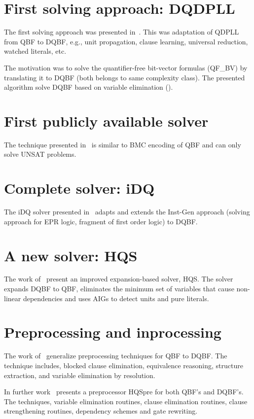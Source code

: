 \documentclass[runningheads]{llncs}
\begin{document}
\section{First solving approach: DQDPLL}
The first solving approach was presented in~\cite{frohlich2012dpll}.
%
This was adaptation of QDPLL from QBF to DQBF, e.g., unit propagation, clause
learning, universal reduction, watched literals, etc.
%

The motivation was to solve the quantifier-free bit-vector formulas (QF\_BV) by translating it to DQBF (both belongs to same complexity class).
%
The presented algorithm solve DQBF based on variable elimination (\cite{biere2004resolve}).

\section{First publicly available solver}
The technique presented in~\cite{finkbeiner2014fast} is similar to BMC encoding of QBF and can only solve UNSAT problems.  

\section{Complete solver: iDQ}
The iDQ solver presented in~\cite{frohlich2014idq} adapts and extends the Inst-Gen approach (solving approach for EPR logic, fragment of first order logic) to DQBF.

\section{A new solver: HQS}
The work of~\cite{gitina2015solving} present an improved expansion-based solver, HQS.
%
The solver expands DQBF to QBF, eliminates the minimum set of variables that cause non-linear
dependencies and uses AIGs to detect units and pure literals.

\section{Preprocessing and inprocessing}
The work of~\cite{wimmer2015preprocessing} generalize preprocessing techniques for QBF to DQBF. 
%
The technique includes, blocked clause elimination, equivalence reasoning, structure extraction, and variable elimination by resolution.

In further work~\cite{wimmer2017hqspre} presents a preprocessor HQSpre for both QBF's and DQBF's.
%
The techniques, variable elimination routines, clause elimination routines, clause strengthening routines, dependency schemes and gate rewriting.
\end{document}
